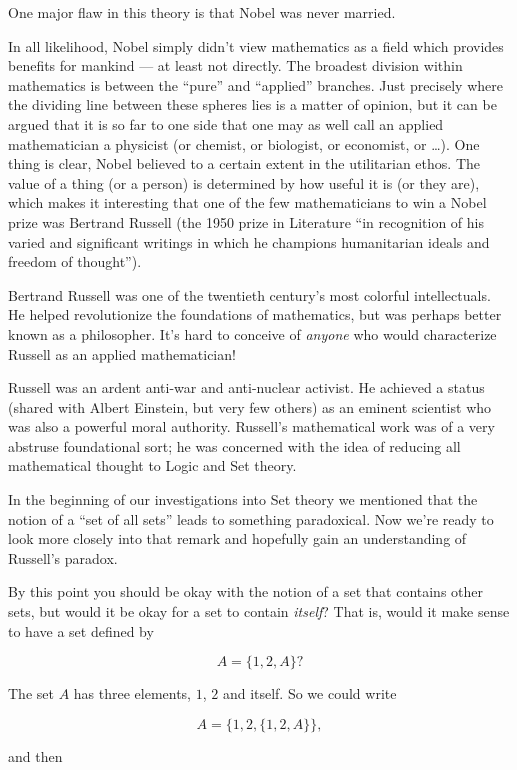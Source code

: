 One major flaw in this theory is that Nobel was never married.

In all likelihood, Nobel simply didn't view mathematics as a field
which provides benefits for mankind --- at least not directly. 
The broadest division within mathematics is between the ``pure''
and ``applied'' branches.  Just precisely where the dividing line
between these spheres lies is a matter of opinion, but it can be
argued that it is so far to one side that one may as well call an
applied mathematician a physicist 
(or chemist, or biologist, or economist, or \ldots).  One thing is
clear, Nobel believed to a certain extent in the utilitarian ethos.
The value of a thing (or a person) is determined by how useful it is (or they 
are), which makes it interesting that one of the few mathematicians
to win a Nobel prize was Bertrand Russell (the 1950 prize in Literature
 ``in recognition of his varied and significant writings in which he 
champions humanitarian ideals and freedom of thought''). 
 
Bertrand Russell was one of the twentieth century's most colorful
intellectuals.  He helped revolutionize the foundations of mathematics,
but was perhaps better known as a philosopher.  It's hard to conceive 
of \emph{anyone} who would characterize Russell as an applied mathematician!

Russell was an ardent anti-war and anti-nuclear activist.  He achieved a
status (shared with Albert Einstein, but very few others) as an eminent
scientist who was also a powerful moral authority.  Russell's mathematical
work was of a very abstruse foundational sort; he was concerned with
the idea of reducing all mathematical thought to Logic and Set theory.

In the beginning of our investigations into Set theory we mentioned 
that the notion of a ``set of all sets'' leads to something paradoxical.
Now we're ready to look more closely into that remark and hopefully 
gain an understanding of Russell's paradox.

By this point you should be okay with the notion of a set that 
contains other sets, but would it be okay for a set to contain
\emph{itself}?  That is, would it make sense to have a set 
defined by

\[ A = \{ 1, 2, A \}? \]

\noindent The set $A$ has three elements, $1$, $2$ and itself.  So we
could write

\[ A = \{ 1, 2, \{ 1, 2, A \} \}, \]
 
\noindent and then

